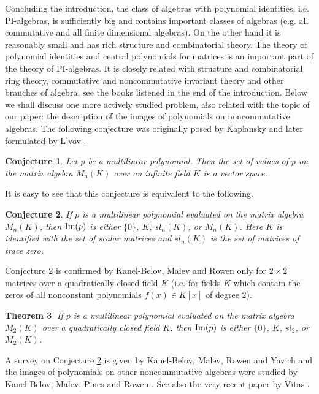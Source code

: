 \documentclass[12pt]{amsart}
\newtheorem{theorem}{Theorem}[section]
\newtheorem{conjecture}[theorem]{Conjecture}
\theoremstyle{definition}
\begin{document}
Concluding the introduction, the class of algebras with polynomial identities, i.e. PI-algebras,
is sufficiently big and contains important classes of algebras (e.g. all commutative and all finite dimensional algebras).
On the other hand it is reasonably small and has rich structure and combinatorial theory.
The theory of polynomial identities and central polynomials for matrices is an important part of the theory of PI-algebras.
It is closely related with structure and combinatorial ring theory, commutative and noncommutative invariant theory and other branches of algebra, see the books
listened in the end of the introduction. Below we shall discuss one more actively studied problem, also related with the topic of our paper:
the description of the images of polynomials on noncommutative algebras. The following conjecture was originally posed by Kaplansky
and later formulated by L'vov \cite[Question 1.98]{DnN}.

\begin{conjecture}\label{L'vov-Kaplansky}
Let $p$ be a multilinear polynomial. Then the set of values
of $p$ on the matrix algebra $M_n(K)$ over an infinite field $K$ is a vector space.
\end{conjecture}

It is easy to see that this conjecture is equivalent to the following.

\begin{conjecture}\label{L'vov-Kaplansky revised}
If $p$ is a multilinear polynomial evaluated on the matrix algebra $M_n(K)$, then
$\text{\rm Im}(p)$ is either $\{0\}$, $K$, $sl_n(K)$, or $M_n(K)$. Here $K$ is identified with the set of scalar matrices
and $sl_n(K)$ is the set of matrices of trace zero.
\end{conjecture}

Conjecture \ref{L'vov-Kaplansky revised} is confirmed by Kanel-Belov, Malev and Rowen \cite{K-BMRow}
only for $2\times 2$ matrices over a quadratically closed field $K$ (i.e. for fields $K$ which contain the zeros of all
nonconstant polynomials $f(x)\in K[x]$ of degree 2).

\begin{theorem}\cite[Theorem 2]{K-BMRow}
If $p$ is a multilinear polynomial evaluated on the matrix algebra $M_2(K)$ over a quadratically closed field $K$, then $\text{\rm Im}(p)$ is either
$\{0\}$, $K$, $sl_2$, or $M_2(K)$.
\end{theorem}

A survey on Conjecture \ref{L'vov-Kaplansky revised} is given by Kanel-Belov, Malev, Rowen and Yavich \cite{K-BMRowY}
and the images of polynomials on other noncommutative algebras were studied by
Kanel-Belov, Malev, Pines and Rowen \cite{K-BMPRow}. See also the very recent paper by Vitas \cite{V}.
\end{document}
